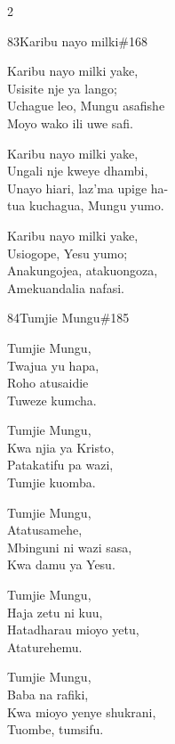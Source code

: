 \begin{multicols}{2}
\begin{hymn}{83}{Karibu nayo milki}{\#168}
\begin{stanza}
Karibu nayo milki yake,\\
Usisite nje ya lango;\\
Uchague leo, Mungu asafishe\\
Moyo wako ili uwe safi.
\end{stanza}
\begin{stanza}
Karibu nayo milki yake,\\
Ungali nje kweye dhambi,\\
Unayo hiari, laz'ma upige ha-\\
tua kuchagua, Mungu yumo.
\end{stanza}
\begin{stanza}
Karibu nayo milki yake,\\
Usiogope, Yesu yumo;\\
Anakungojea, atakuongoza,\\
Amekuandalia nafasi.
\end{stanza}
\end{hymn}

\begin{hymn}{84}{Tumjie Mungu}{\#185}
\begin{stanza}
Tumjie Mungu,\\
Twajua yu hapa,\\
Roho atusaidie\\
Tuweze kumcha.
\end{stanza}
\begin{chorus}
Tumjie Mungu,\\
Kwa njia ya Kristo,\\
Patakatifu pa wazi,\\
Tumjie kuomba.
\end{chorus}
\begin{stanza}
Tumjie Mungu,\\
Atatusamehe,\\
Mbinguni ni wazi sasa,\\
Kwa damu ya Yesu.
\end{stanza}
\begin{stanza}
Tumjie Mungu,\\
Haja zetu ni kuu,\\
Hatadharau mioyo yetu,\\
Ataturehemu.
\end{stanza}
\begin{stanza}
Tumjie Mungu,\\
Baba na rafiki,\\
Kwa mioyo yenye shukrani,\\
Tuombe, tumsifu.
\end{stanza}
\end{hymn}


\end{multicols}

